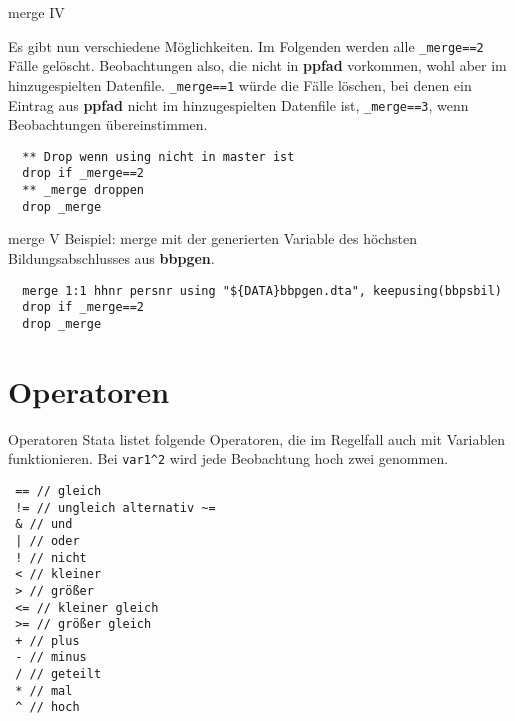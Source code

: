 \begin{frame}[fragile]{merge IV}
\begin{minipage}{11cm}
Es gibt nun verschiedene Möglichkeiten. Im Folgenden werden alle \texttt{\_merge==2} Fälle gelöscht. Beobachtungen also, die nicht in \textbf{ppfad} vorkommen, wohl aber im hinzugespielten Datenfile. \texttt{\_merge==1} würde die Fälle löschen, bei denen ein Eintrag aus \textbf{ppfad} nicht im hinzugespielten Datenfile ist, \texttt{\_merge==3}, wenn Beobachtungen übereinstimmen.
\begin{lstlisting}
  ** Drop wenn using nicht in master ist
  drop if _merge==2
  ** _merge droppen
  drop _merge
\end{lstlisting}
\end{minipage}



\end{frame}

\begin{frame}[fragile]{merge V}  
Beispiel: merge mit der generierten Variable des höchsten Bildungsabschlusses aus \textbf{bbpgen}.

\begin{lstlisting}
  merge 1:1 hhnr persnr using "${DATA}bbpgen.dta", keepusing(bbpsbil)
  drop if _merge==2
  drop _merge
\end{lstlisting}

\end{frame}

\section{Operatoren}
\begin{frame}[fragile]{Operatoren} 
Stata listet folgende Operatoren, die im Regelfall auch mit Variablen funktionieren. Bei \texttt{var1\^{}2} wird jede Beobachtung hoch zwei genommen.
\begin{lstlisting}
 == // gleich
 != // ungleich alternativ ~=
 & // und
 | // oder
 ! // nicht
 < // kleiner
 > // größer
 <= // kleiner gleich
 >= // größer gleich
 + // plus
 - // minus
 / // geteilt
 * // mal
 ^ // hoch
\end{lstlisting}
\end{frame}

